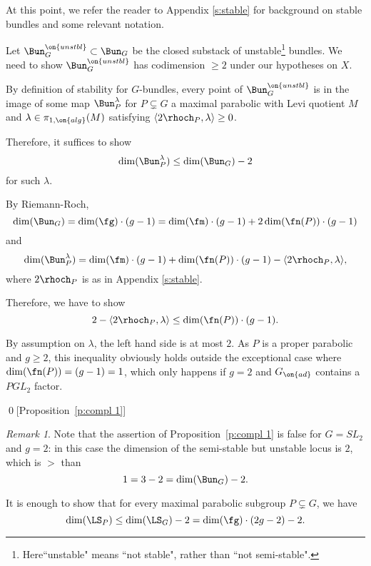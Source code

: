 \documentclass[9pt]{amsart}
\theoremstyle{remark}
\newtheorem{rem}[subsubsection]{Remark}
\theoremstyle{definition}
\theoremstyle{remark}
\newcommand{\propref}[1]{Proposition~\ref{#1}}
\numberwithin{equation}{section}
\begin{document}
\sssec{} At this point, we 
refer the reader to Appendix \ref{s:stable} for background
on stable bundles and some relevant notation.

\medskip 

Let $\Bun_G^{\on{unstbl}} \subset \Bun_G$ be the closed substack
of unstable\footnote{Here``unstable" means ``not stable", rather than ``not semi-stable".}  bundles. We need to show $\Bun_G^{\on{unstbl}}$ has 
codimension $\geq 2$ under our hypotheses on $X$.

\medskip 

By definition of stability for $G$-bundles, 
every point of $\Bun_G^{\on{unstbl}}$ is in the image of some map
$\Bun_P^{\lambda}$ for $P \subsetneq G$ a maximal parabolic
with Levi quotient $M$ and $\lambda \in \pi_{1,\on{alg}}(M)$
satisfying $\langle 2\rhoch_P,\lambda\rangle \geq 0$.

\medskip

Therefore, it suffices to show
$$\dim(\Bun_P^{\lambda}) \leq \dim(\Bun_G) - 2$$
for such $\lambda$.

\sssec{}

By Riemann-Roch, 
$$\dim(\Bun_G)=\dim(\fg)\cdot (g-1) = 
\dim(\fm)\cdot(g-1)+2\dim(\fn(P))\cdot (g-1)$$
and
$$\dim(\Bun^\lambda_P)=\dim(\fm)\cdot (g-1)+\dim(\fn(P))\cdot (g-1) -\langle 2\rhoch_P,\lambda\rangle,$$
where $2\rhoch_P$ is as in Appendix \ref{s:stable}. 

\medskip 

Therefore, we have to show 
$$2-\langle 2\rhoch_P,\lambda\rangle \leq \dim(\fn(P))\cdot (g-1).$$

By assumption on $\lambda$, the left hand side is at most $2$.
As $P$ is a proper parabolic and $g \geq 2$, this inequality obviously 
holds outside the exceptional
case where $\dim(\fn(P)) = (g-1) = 1$, which only happens if
$g = 2$ and $G_{\on{ad}}$ contains a $PGL_2$ factor.

\qed[\propref{p:compl 1}]

\begin{rem}
Note that the assertion of \propref{p:compl 1} is false for $G=SL_2$ and $g=2$: in this case the dimension
of the semi-stable but unstable locus is $2$, which is $>$ than 
$$1=3-2=\dim(\Bun_G)-2.$$
\end{rem} 

\ssec{Proof of \propref{p:compl 2}} \label{ss:proof of compl 2}

It is enough to show that for every maximal parabolic subgroup $P \subsetneq G$, we have
\begin{equation} \label{e:LS ineq}
\dim(\LS_P)\leq \dim(\LS_G)-2=\dim(\fg)\cdot (2g-2)-2.
\end{equation} 
\end{document}
